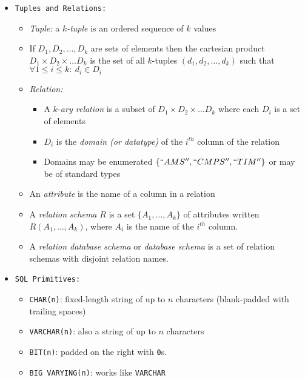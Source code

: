 \documentclass[landscape,8pt]{extarticle}
\newcommand{\code}{\lstinline}
\begin{document}
    \footnotesize
    \begin{multicols}{4}
    \setlength{\premulticols}{1pt}
    \setlength{\postmulticols}{1pt}
    \setlength{\multicolsep}{1pt}
    \setlength{\columnsep}{2pt}
    \begin{itemize}
    \item \code{Tuples and Relations:}
    \begin{itemize}
        \item \emph{Tuple:} a $k$\emph{-tuple} is an ordered sequence of $k$ values
        \item If $D_1, D_2, \ldots, D_k$ are sets of elements then the cartesian product $D_1 \times
        D_2 \times \ldots D_k$ is the set of all $k$-tuples $(d_1, d_2, \ldots, d_k)$ such that
        $\forall 1 \leq i \leq k:\ d_i \in D_i$
        \item \emph{Relation:}
        \begin{itemize}
            \item A $k$\emph{-ary relation} is a subset of $D_1 \times D_2 \times \ldots D_k$ where
            each $D_i$ is a set of elements
            \item $D_i$ is the \emph{domain (or datatype)} of the $i^{th}$ column of the relation
            \item Domains may be enumerated $\{``AMS'', ``CMPS'', ``TIM''\}$ or may be of standard
            types 
        \end{itemize}
        \item An \emph{attribute} is the name of a column in a relation
        \item A \emph{relation schema} $R$ is a set $\{A_1, \ldots, A_k\}$ of attributes written
        $R(A_1, \ldots, A_k)$, where $A_i$ is the name of the $i^{th}$ column. 
        \item A \emph{relation database schema} or \emph{database schema} is a set of relation
        schemas with disjoint relation names.
    \end{itemize}
    \item \code{SQL Primitives:}
    \begin{itemize}
        \item \code{CHAR(n)}: fixed-length string of up to $n$ characters (blank-padded with
        trailing spaces)
        \item \code{VARCHAR(n)}: also a string of up to $n$ characters
        \item \code{BIT(n)}: padded on the right with \code{0}s.
        \item \code{BIG VARYING(n)}: works like \code{VARCHAR}

\end{itemize}
\end{itemize}
\end{multicols}
\end{document}
